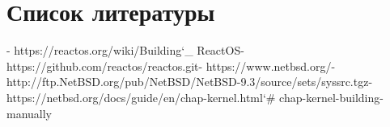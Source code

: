 \documentclass[a4paper, 14pt]{extarticle}
\begin{document}
\section{Список литературы}
\begin{flushleft}
[1] - https://reactos.org/wiki/Building\char`_ ReactOS\newline
[2] - https://github.com/reactos/reactos.git\newline
[3] - https://www.netbsd.org/\newline
[4] - http://ftp.NetBSD.org/pub/NetBSD/NetBSD-9.3/source/sets/syssrc.tgz\newline
[5] - https://netbsd.org/docs/guide/en/chap-kernel.html\char`# chap-kernel-building-manually\newline
\end{flushleft}
\end{document}
